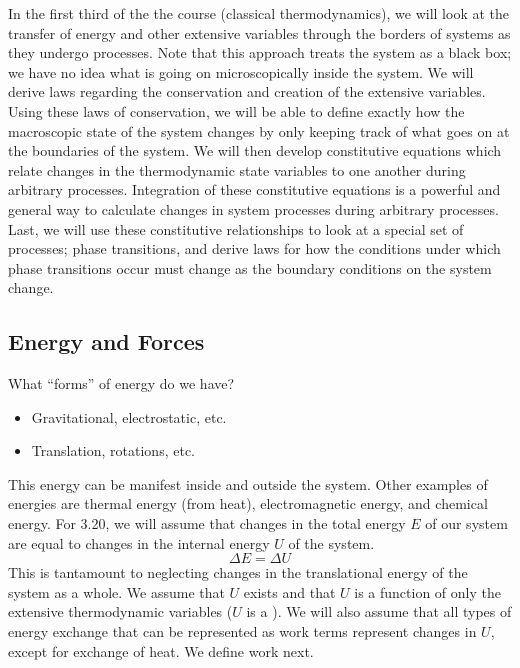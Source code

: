 \documentclass[12pt]{article}
\begin{document}
In the first third of the the course (classical thermodynamics), we will look at the transfer of energy and other extensive variables through the borders of systems as they undergo processes. Note that this approach treats the system as a black box; we have no idea what is going on microscopically inside the system. We will derive laws regarding the conservation and creation of the extensive variables. Using these laws of conservation, we will be able to define exactly how the macroscopic state of the system changes by only keeping track of what goes on at the boundaries of the system. We will then develop constitutive equations which relate changes in the thermodynamic state variables to one another during arbitrary processes. Integration of these constitutive equations is a powerful and general way to calculate changes in system processes during arbitrary processes. Last, we will use these constitutive relationships to look at a special set of processes; phase transitions, and derive laws for how the conditions under which phase transitions occur must change as the boundary conditions on the system change.

\subsection{Energy and Forces}
What ``forms'' of energy do we have?
\begin{itemize}
\item {} Gravitational, electrostatic, etc.
\item {} Translation, rotations, etc.  
\end{itemize}
This energy can be manifest inside and outside the system.  Other examples of energies are thermal energy (from heat), electromagnetic energy, and chemical energy.
For 3.20, we will assume that changes in the total energy $E$ of our system are equal to changes in the internal energy $U$ of the system.
\begin{equation}
\Delta E = \Delta U
\end{equation}
This is tantamount to neglecting changes in the translational energy of the system as a whole. We assume that $U$ exists and that $U$ is a function of only the extensive thermodynamic variables ($U$ is a ). We will also assume that all types of energy exchange that %
can be represented as work terms represent changes in $U$, except for exchange of heat. We define work next.
\end{document}
